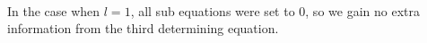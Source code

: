 \begin{align*}
\end{align*}
In the case when $l=1$, all sub equations were set to 0, so we gain no extra information from the third determining equation.